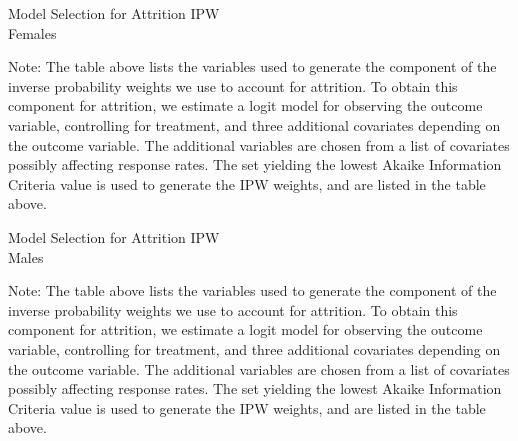 \begin{table}
\caption{Model Selection for Attrition IPW \\ Females }
\label{table:ms_attrit_pooled}
\centering
\begin{adjustbox}{max width=\textwidth}
\begin{threeparttable}

\begin{tablenotes}
\tiny
\item Note: The table above lists the variables used to generate the component of the
inverse probability weights we use to account for attrition. To obtain this
component for attrition, we estimate a logit model for observing the outcome variable,
controlling for treatment, and three additional covariates depending on the outcome
variable. The additional variables are chosen from a list of covariates possibly affecting
response rates. The set yielding the lowest Akaike Information Criteria value is used to
generate the IPW weights, and are listed in the table above.
\end{tablenotes}
\end{threeparttable}
\end{adjustbox}
\end{table}



\begin{table}
\caption{Model Selection for Attrition IPW \\ Males }
\label{table:ms_attrit_pooled}
\centering
\begin{adjustbox}{max width=\textwidth}
\begin{threeparttable}

\begin{tablenotes}
\tiny
\item Note: The table above lists the variables used to generate the component of the
inverse probability weights we use to account for attrition. To obtain this
component for attrition, we estimate a logit model for observing the outcome variable,
controlling for treatment, and three additional covariates depending on the outcome
variable. The additional variables are chosen from a list of covariates possibly affecting
response rates. The set yielding the lowest Akaike Information Criteria value is used to
generate the IPW weights, and are listed in the table above.
\end{tablenotes}
\end{threeparttable}
\end{adjustbox}
\end{table}

